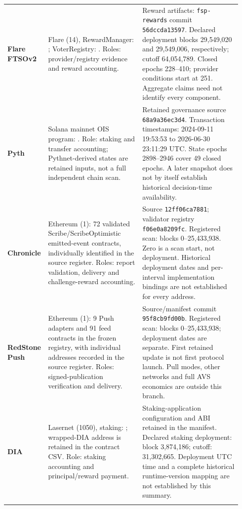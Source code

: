 \begin{longtable}{@{}L{0.12\linewidth} L{0.40\linewidth} L{0.42\linewidth}@{}}
\textbf{Flare FTSOv2} & Flare (14), RewardManager: ; VoterRegistry: . Roles: provider/registry evidence and reward accounting. & Reward artifacts: \texttt{fsp-rewards} commit \texttt{56dccda13597}. Declared deployment blocks 29,549,020 and 29,549,006, respectively; cutoff 64,054,789. Closed epochs 228--410; provider conditions start at 251. Aggregate claims need not identify every component. \\ \addlinespace[3pt]
\textbf{Pyth} & Solana mainnet OIS program: . Role: staking and transfer accounting; Pythnet-derived states are retained inputs, not a full independent chain scan. & Retained governance source \texttt{68a9a36ec3d4}. Transaction timestamps: 2024-09-11 19:53:53 to 2026-06-30 23:11:29 UTC. State epochs 2898--2946 cover 49 closed epochs. A later snapshot does not by itself establish historical decision-time availability. \\ \addlinespace[3pt]
\textbf{Chronicle} & Ethereum (1): 72 validated Scribe/ScribeOptimistic emitted-event contracts, individually identified in the source register. Roles: report validation, delivery and challenge-reward accounting. & Source \texttt{12ff06ca7881}; validator registry \texttt{f06e0a8209fc}. Registered scan: blocks 0--25,433,938. Zero is a scan start, not deployment. Historical deployment dates and per-interval implementation bindings are not established for every address. \\ \addlinespace[3pt]
\textbf{RedStone Push} & Ethereum (1): 9 Push adapters and 91 feed contracts in the frozen registry, with individual addresses recorded in the source register. Roles: signed-publication verification and delivery. & Source/manifest commit \texttt{95f8cb9fd00b}. Registered scan: blocks 0--25,433,938; deployment dates are separate. First retained update is not first protocol launch. Pull modes, other networks and full AVS economics are outside this branch. \\ \addlinespace[3pt]
\textbf{DIA} & Lasernet (1050), staking: ; wrapped-DIA address is retained in the contract CSV. Role: staking accounting and principal/reward payment. & Staking-application configuration and ABI retained in the manifest. Declared staking deployment: block 3,874,186; cutoff: 31,302,665. Deployment UTC time and a complete historical runtime-version mapping are not established by this summary. \\ \addlinespace[3pt]
\end{longtable}
\endgroup
